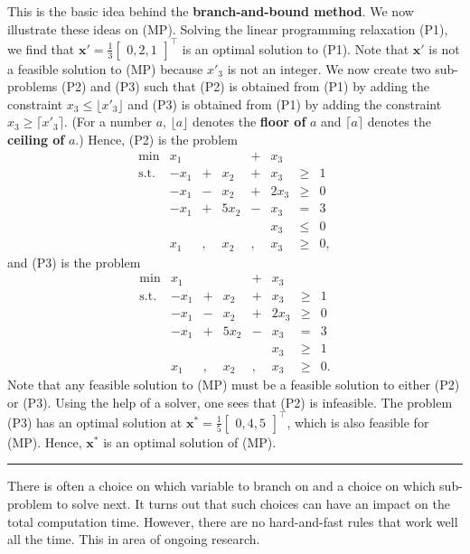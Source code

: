 This is the basic idea behind the \textbf{branch-and-bound method}. We now
illustrate these ideas on (MP).
\newl Solving the linear programming relaxation (P1), we find that
\(\mathbf{x}' = \frac{1}{3}\begin{bmatrix}0,2,1\end{bmatrix}^{\!\top}\)
is an optimal solution to (P1). Note that \(\mathbf{x}'\) is not a
feasible solution to (MP) because \(x'_3\) is not an integer. We now
create two sub-problems (P2) and (P3) such that (P2) is obtained from
(P1) by adding the constraint \(x_3 \leq \lfloor x'_3\rfloor\) and (P3)
is obtained from (P1) by adding the constraint
\(x_3 \geq \lceil x'_3\rceil\). (For a number \(a\),
\(\lfloor a \rfloor\) denotes the \textbf{floor of} \(a\) and
\(\lceil a \rceil\) denotes the \textbf{ceiling of} \(a\).) Hence,
(P2) is the problem \[\begin{array}{rrcrcrlll}
\min & x_1 &  &  & + & x_3  \\
\text{s.t.} & -x_1 & + &  x_2 & + &  x_3  & \geq & 1 \\
 & -x_1 & - &  x_2 & + & 2x_3  & \geq & 0 \\
 & -x_1 & + & 5x_2 & - &  x_3  & = & 3 \\
 &      &   &      &   &  x_3  & \leq & 0 \\
 &  x_1 & , & x_2 & , & x_3 & \geq & 0,
\end{array}\] and (P3) is the problem \[\begin{array}{rrcrcrlll}
\min & x_1 &  &  & + & x_3  \\
\text{s.t.} & -x_1 & + &  x_2 & + &  x_3  & \geq & 1 \\
 & -x_1 & - &  x_2 & + & 2x_3  & \geq & 0 \\
 & -x_1 & + & 5x_2 & - &  x_3  & = & 3 \\
 &      &   &      &   &  x_3  & \geq & 1 \\
 &  x_1 & , & x_2 & , & x_3 & \geq & 0.
\end{array}\] Note that any feasible solution to (MP) must be a feasible
solution to either (P2) or (P3). Using the help of a solver, one sees
that (P2) is infeasible. The problem (P3) has an optimal solution at
\(\mathbf{x}^* = \frac{1}{5}\begin{bmatrix}0,4,5\end{bmatrix}^{\!\top}\),
which is also feasible for (MP). Hence,
\(\mathbf{x}^*\) is an
optimal solution of (MP).
\begin{center}\rule{0.5\linewidth}{.4pt}\end{center}
There is often a choice on which variable to branch on and a choice on
which sub-problem to solve next. It turns out that such choices can have
an impact on the total computation time. However, there are no
hard-and-fast rules that work well all the time. This in area of ongoing
research.


